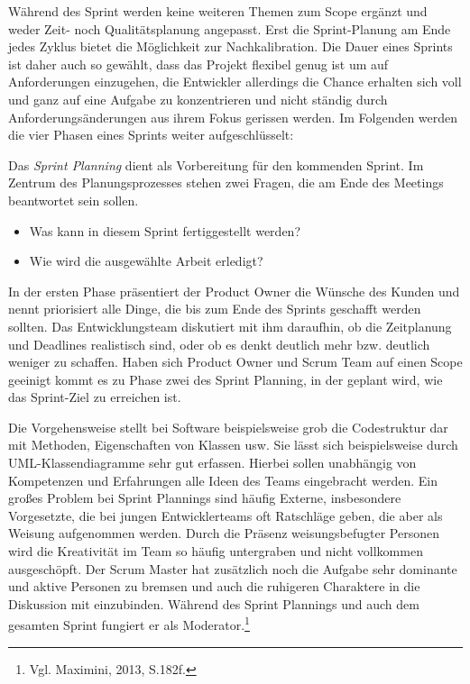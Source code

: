 
                Während des Sprint werden keine weiteren Themen zum Scope ergänzt und weder Zeit- noch Qualitätsplanung angepasst. Erst die Sprint-Planung am Ende jedes Zyklus bietet die Möglichkeit zur Nachkalibration. Die Dauer eines Sprints ist daher auch so gewählt, dass das Projekt flexibel genug ist um auf Anforderungen einzugehen, die Entwickler allerdings die Chance erhalten sich voll und ganz auf eine Aufgabe zu konzentrieren und nicht ständig durch Anforderungsänderungen aus ihrem Fokus gerissen werden. Im Folgenden werden die vier Phasen eines Sprints weiter aufgeschlüsselt:

                Das \emph{Sprint Planning} dient als Vorbereitung für den kommenden Sprint. Im Zentrum des Planungsprozesses stehen zwei Fragen, die am Ende des Meetings beantwortet sein sollen.
                \begin{itemize}
                  \item Was kann in diesem Sprint fertiggestellt werden?
                  \item Wie wird die ausgewählte Arbeit erledigt?
                \end{itemize}

                In der ersten Phase präsentiert der Product Owner die Wünsche des Kunden und nennt priorisiert alle Dinge, die bis zum Ende des Sprints geschafft werden sollten. Das Entwicklungsteam diskutiert mit ihm daraufhin, ob die Zeitplanung und Deadlines realistisch sind, oder ob es denkt deutlich mehr bzw. deutlich weniger zu schaffen. Haben sich Product Owner und Scrum Team auf einen Scope geeinigt kommt es zu Phase zwei des Sprint Planning, in der geplant wird, wie das Sprint-Ziel zu erreichen ist.

                Die Vorgehensweise stellt bei Software beispielsweise grob die Codestruktur dar mit Methoden, Eigenschaften von Klassen usw. Sie lässt sich beispielsweise durch UML-Klassendiagramme sehr gut erfassen. Hierbei sollen unabhängig von Kompetenzen und Erfahrungen alle Ideen des Teams eingebracht werden. Ein großes Problem bei Sprint Plannings sind häufig Externe, insbesondere Vorgesetzte, die bei jungen Entwicklerteams oft Ratschläge geben, die aber als Weisung aufgenommen werden. Durch die Präsenz weisungsbefugter Personen wird die Kreativität im Team so häufig untergraben und nicht vollkommen ausgeschöpft.
                Der Scrum Master hat zusätzlich noch die Aufgabe sehr dominante und aktive Personen zu bremsen und auch die ruhigeren Charaktere in die Diskussion mit einzubinden. Während des Sprint Plannings und auch dem gesamten Sprint fungiert er als Moderator.\footnote{Vgl. Maximini, 2013, S.182f.}

